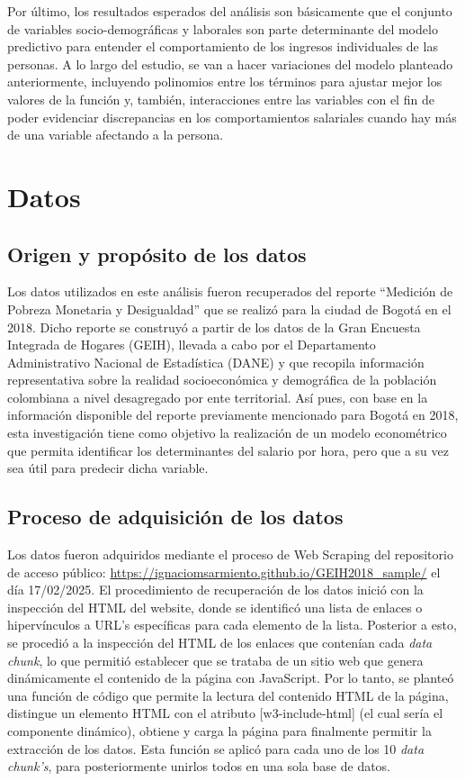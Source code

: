 \documentclass[10pt]{article}
\begin{document}
Por último, los resultados esperados del análisis son básicamente que el conjunto de variables socio-demográficas y laborales son parte determinante del modelo predictivo para entender el comportamiento de los ingresos individuales de las personas. A lo largo del estudio, se van a hacer variaciones del modelo planteado anteriormente, incluyendo polinomios entre los términos para ajustar mejor los valores de la función y, también, interacciones entre las variables con el fin de poder evidenciar discrepancias en los comportamientos salariales cuando hay más de una variable afectando a la persona. 




\section{Datos} \label{sec:Datos}

\subsection{Origen y propósito de los datos}

Los datos utilizados en este análisis fueron recuperados del reporte “Medición de Pobreza Monetaria y Desigualdad” que se realizó para la ciudad de Bogotá en el 2018. Dicho reporte se construyó a partir de los datos de la Gran Encuesta Integrada de Hogares (GEIH), llevada a cabo por el Departamento Administrativo Nacional de Estadística (DANE) y que recopila información representativa sobre la realidad socioeconómica y demográfica de la población colombiana a nivel desagregado por ente territorial. Así pues, con base en la información disponible del reporte previamente mencionado para Bogotá en 2018, esta investigación tiene como objetivo la realización de un modelo econométrico que permita identificar los determinantes del salario por hora, pero que a su vez sea útil para predecir dicha variable.

\subsection{Proceso de adquisición de los datos}

Los datos fueron adquiridos mediante el proceso de Web Scraping del repositorio de acceso público:  
\url{https://ignaciomsarmiento.github.io/GEIH2018_sample/}  
el día 17/02/2025.
El procedimiento de recuperación de los datos inició con la inspección del HTML del website, donde se identificó una lista de enlaces o hipervínculos a URL's específicas para cada elemento de la lista. Posterior a esto, se procedió a la inspección del HTML de los enlaces que contenían cada \textit{data chunk}, lo que permitió establecer que se trataba de un sitio web que genera dinámicamente el contenido de la página con JavaScript. Por lo tanto, se planteó una función de código que permite la lectura del contenido HTML de la página, distingue un elemento HTML con el atributo [w3-include-html] (el cual sería el componente dinámico), obtiene y carga la página para finalmente permitir la extracción de los datos. Esta función se aplicó para cada uno de los 10 \textit{data chunk's}, para posteriormente unirlos todos en una sola base de datos.
\end{document}
